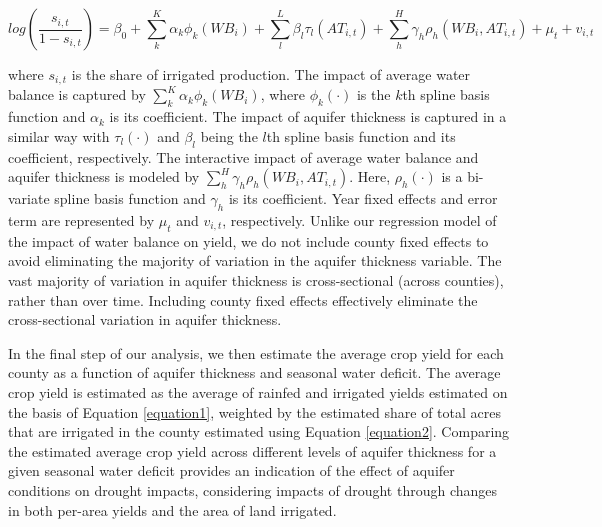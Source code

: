 \documentclass[
]{article}
\begin{document}
\begin{equation}\label{equation2}
    log(\frac{s_{i,t}}{1-s_{i,t}}) = \beta_0 + \sum_{k}^K \alpha_{k}\phi_{k}(WB_{i}) + \sum_{l}^L \beta_{l}\tau_{l}(AT_{i,t}) + \sum_{h}^H \gamma_{h}\rho_{h}(WB_{i}, AT_{i,t}) + \mu_t + v_{i,t}
\end{equation}

where \(s_{i,t}\) is the share of irrigated production. The impact of average water balance is captured by $\sum_{k}^K \alpha_{k}\phi_{k}(WB_{i})$, where $\phi_{k}(\cdot)$ is the $k$th spline basis function and $\alpha_{k}$ is its coefficient. The impact of aquifer thickness is captured in a similar way with $\tau_{l}(\cdot)$ and $\beta_{l}$ being the $l$th spline basis function and its coefficient, respectively. The interactive impact of average water balance and aquifer thickness is modeled by $\sum_{h}^H \gamma_{h}\rho_{h}(WB_{i}, AT_{i,t})$. Here, $\rho_{h}(\cdot)$ is a bi-variate spline basis function and $\gamma_{h}$ is its coefficient. Year fixed effects and error term are represented by $\mu_t$ and $v_{i,t}$, respectively. Unlike our regression model of the impact of water balance on yield, we do not include county fixed effects to avoid eliminating the majority of variation in the aquifer thickness variable. The vast majority of variation in aquifer thickness is cross-sectional (across counties), rather than over time. Including county fixed effects effectively eliminate the cross-sectional variation in aquifer thickness.

In the final step of our analysis, we then estimate the average crop yield for each county as a function of aquifer thickness and seasonal water deficit. The average crop yield is estimated as the average of rainfed and irrigated yields estimated on the basis of Equation \ref{equation1}, weighted by the estimated share of total acres that are irrigated in the county estimated using Equation \ref{equation2}. Comparing the estimated average crop yield across different levels of aquifer thickness for a given seasonal water deficit provides an indication of the effect of aquifer conditions on drought impacts, considering impacts of drought through changes in both per-area yields and the area of land irrigated.  
\end{document}
